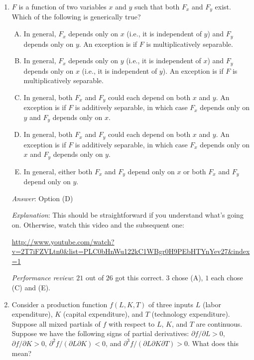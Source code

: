\documentclass[10pt]{amsart}
\begin{document}
\begin{enumerate}
  {\em Explanation}: One extreme way of seeing this is that if $F$ is
  additively separable (i.e., it is the sum of a function of $x$ and a
  function of $y$) then $F_{xy}(x,y) = 0$. Thus, the stereotypical
  case in which the variables don't interact with each other is the
  case that the second-order mixed partial is zero.

  {\em Performance review}: $19$ out of $26$ got this correct. $4$
  chose (D), $2$ chose (B), $1$ chose (C).

\item $F$ is a function of two variables $x$ and $y$ such that both
  $F_x$ and $F_y$ exist. Which of the following is generically true?

  \begin{enumerate}[(A)]
  \item In general, $F_x$ depends only on $x$ (i.e., it is independent
    of $y$) and $F_y$ depends only on $y$. An exception is if $F$ is
    multiplicatively separable.
  \item In general, $F_x$ depends only on $y$ (i.e., it is independent
    of $x$) and $F_y$ depends only on $x$ (i.e., it is independent of
    $y$). An exception is if $F$ is multiplicatively separable.
  \item In general, both $F_x$ and $F_y$ could each depend on both $x$
    and $y$. An exception is if $F$ is additively separable, in which
    case $F_x$ depends only on $y$ and $F_y$ depends only on $x$.
  \item In general, both $F_x$ and $F_y$ could each depend on both $x$
    and $y$. An exception is if $F$ is additively separable, in which
    case $F_x$ depends only on $x$ and $F_y$ depends only on $y$.
  \item In general, either both $F_x$ and $F_y$ depend only on $x$ or
    both $F_x$ and $F_y$ depend only on $y$.
  \end{enumerate}
  
  {\em Answer}: Option (D)

  {\em Explanation}: This should be straightforward if you understand
  what's going on. Otherwise, watch this video and the subsequent one:

  \url{http://www.youtube.com/watch?v=2T7iFZVLtn0&list=PLC0bHnWu122kC1WBgr0H9PEbHTYnYev27&index=1}

  {\em Performance review}: $21$ out of $26$ got this correct. $3$
  chose (A), $1$ each chose (C) and (E).

\item Consider a production function $f(L,K,T)$ of three inputs $L$
  (labor expenditure), $K$ (capital expenditure), and $T$ (technology
  expenditure). Suppose all mixed partials of $f$ with respect to $L$,
  $K$, and $T$ are continuous. Suppose we have the following signs of
  partial derivatives: $\partial f/\partial L > 0$, $\partial
  f/\partial K > 0$, $\partial^2f/(\partial L \partial K) < 0$, and
  $\partial^3f/(\partial L\partial K \partial T) > 0$. What does this
  mean?


\end{enumerate}
\end{document}
